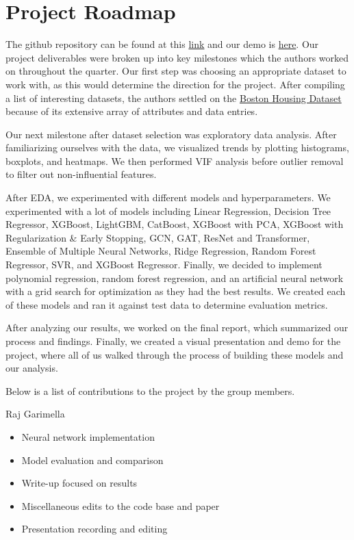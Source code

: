 \documentclass[conference, 11pt]{IEEEtran}
\begin{document}
\section{Project Roadmap}
The github repository can be found at this \href{https://github.com/kklike32/171-Real-Estate}{link} and our demo is \href{https://www.youtube.com/watch?v=x0xYc0DO8yo&feature=youtu.be}{here}. Our project deliverables were broken up into key milestones which the authors worked on throughout the quarter. Our first step was choosing an appropriate dataset to work with, as this would determine the direction for the project. After compiling a list of interesting datasets, the authors settled on the \href{https://www.kaggle.com/code/prasadperera/the-boston-housing-dataset}{Boston Housing Dataset} because of its extensive array of attributes and data entries. 

Our next milestone after dataset selection was exploratory data analysis. After familiarizing ourselves with the data, we visualized trends by plotting histograms, boxplots, and heatmaps. We then performed VIF analysis before outlier removal to filter out non-influential features.

After EDA, we experimented with different models and hyperparameters. We experimented with a lot of models including Linear Regression, Decision Tree Regressor, XGBoost, LightGBM, CatBoost, XGBoost with PCA, XGBoost with Regularization & Early Stopping, GCN, GAT, ResNet and Transformer, Ensemble of Multiple Neural Networks, Ridge Regression, Random Forest Regressor, SVR, and XGBoost Regressor. Finally, we decided to implement polynomial regression, random forest regression, and an artificial neural network with a grid search for optimization as they had the best results. We created each of these models and ran it against test data to determine evaluation metrics.

After analyzing our results, we worked on the final report, which summarized our process and findings. Finally, we created a visual presentation and demo for the project, where all of us walked through the process of building these models and our analysis.
\vspace{0.1in}

Below is a list of contributions to the project by the group members.
\vspace{0.1in}

Raj Garimella 
\begin{itemize}
    \item Neural network implementation
    \item Model evaluation and comparison
    \item Write-up focused on results
    \item Miscellaneous edits to the code base and paper
    \item Presentation recording and editing
\end{itemize}
\vspace{0.1in}
\end{document}
